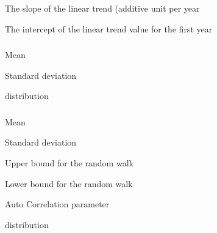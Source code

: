  {The slope of the linear trend (additive unit per year}

 {The intercept of the linear trend value for the first year}

\subsubsection[Random Draw]{}

 {Mean}

 {Standard deviation}

 {distribution}

\subsubsection[Random Walk]{}

 {Mean}

 {Standard deviation}

 {Upper bound for the random walk}

 {Lower bound for the random walk}

 {Auto Correlation parameter}

 {distribution}


